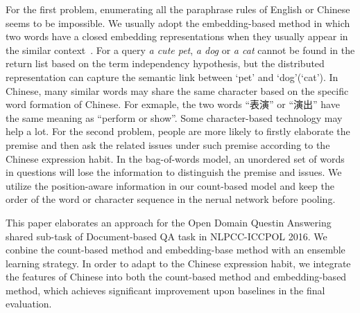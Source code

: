 \documentclass{llncs}
\begin{document}
For the first problem, enumerating all the paraphrase rules of English or Chinese seems to be impossible. We usually adopt the embedding-based method in which two words  have a closed embedding representations when they usually appear in the similar context~\cite{Mikolov2013Distributed}. For a query \emph{a cute pet}, \emph{a dog} or \emph{a cat} cannot be found in the return list based on the term independency hypothesis, but the distributed representation can capture the semantic link between `pet' and `dog'(`cat'). In Chinese, many similar words may share the same character based on the specific word formation of Chinese. For exmaple, the two words ``表演'' or ``演出'' have the same meaning as ``perform or show''. Some character-based technology may help a lot.  
For the second problem, people are more likely to firstly elaborate the premise and then ask the related issues under such premise according to the Chinese expression habit. In the bag-of-words model, an unordered set of words in questions will lose the information to distinguish the premise and issues.
We utilize the position-aware information in our count-based model and keep the order of the word or character sequence in the nerual network before pooling. 

This paper elaborates an approach for the Open Domain Questin Answering shared sub-task of Document-based QA task in NLPCC-ICCPOL 2016. We conbine the count-based method and embedding-base method with an ensemble learning strategy. In order to adapt to the Chinese expression habit, we integrate the features of Chinese into both the count-based method and embedding-based method, which achieves significant improvement upon baselines in the final evaluation.

\end{document}
